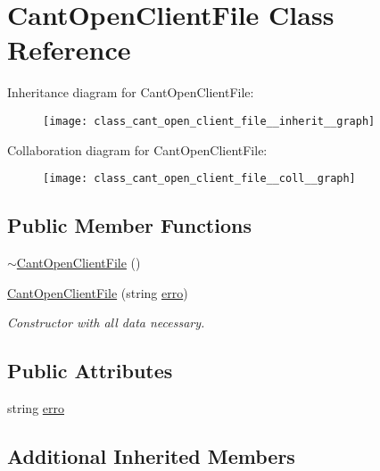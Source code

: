 \hypertarget{class_cant_open_client_file}{}\section{Cant\+Open\+Client\+File Class Reference}
\label{class_cant_open_client_file}


Inheritance diagram for Cant\+Open\+Client\+File\+:
\nopagebreak
\begin{figure}[H]
\begin{center}
\leavevmode
\texttt{[image: class\_cant\_open\_client\_file\_\_inherit\_\_graph]}
\end{center}
\end{figure}


Collaboration diagram for Cant\+Open\+Client\+File\+:
\nopagebreak
\begin{figure}[H]
\begin{center}
\leavevmode
\texttt{[image: class\_cant\_open\_client\_file\_\_coll\_\_graph]}
\end{center}
\end{figure}
\subsection*{Public Member Functions}
\begin{DoxyCompactItemize}
\item 
\hyperlink{class_cant_open_client_file_a2185647136543071c3c98199486caf36}{$\sim$\+Cant\+Open\+Client\+File} ()
\item 
\hyperlink{class_cant_open_client_file_a6190eccfaac3cb2f65f3cfd000ed5fb6}{Cant\+Open\+Client\+File} (string \hyperlink{class_cant_open_client_file_aa4aa82cf39a9e960a76d32da6d379b05}{erro})
\begin{DoxyCompactList}\small\item\em Constructor with all data necessary. \end{DoxyCompactList}\end{DoxyCompactItemize}
\subsection*{Public Attributes}
\begin{DoxyCompactItemize}
\item 
string \hyperlink{class_cant_open_client_file_aa4aa82cf39a9e960a76d32da6d379b05}{erro}
\end{DoxyCompactItemize}
\subsection*{Additional Inherited Members}


